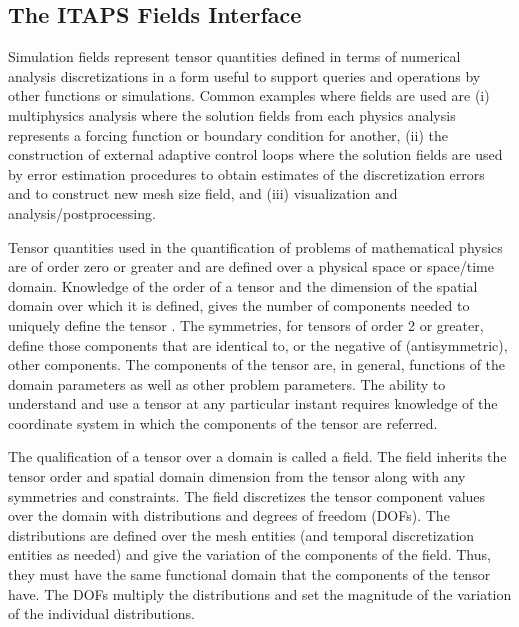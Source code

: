 \subsection{The ITAPS Fields Interface}
\label{sec:fields}

Simulation fields represent tensor quantities defined in terms of
numerical analysis discretizations in a form useful to support queries
and operations by other functions or simulations. Common examples
where fields are used are (i) multiphysics analysis where the solution
fields from each physics analysis represents a forcing function or
boundary condition for another, (ii) the construction of external
adaptive control loops where the solution fields are used by error
estimation procedures to obtain estimates of the discretization errors
and to construct new mesh size field, and (iii) visualization and 
analysis/postprocessing.

Tensor quantities used in the quantification of problems of
mathematical physics are of order zero or greater and are defined over
a physical space or space/time domain.  Knowledge of the order of a
tensor and the dimension of the spatial domain over which it is defined,
gives the number of components needed to uniquely define the tensor
\cite{BeSo83}. The symmetries, for tensors of order 2 or greater,
define those components that are identical to, or the negative of
(antisymmetric), other components. The components of the tensor are,
in general, functions of the domain parameters as well as other
problem parameters. The ability to understand and use a tensor at any
particular instant requires knowledge of the coordinate system in
which the components of the tensor are referred.

The qualification of a tensor over a domain is called a field. The
field inherits the tensor order and spatial domain dimension from the
tensor along with any symmetries and constraints. The field
discretizes the tensor component values over the domain with
distributions and degrees of freedom (DOFs). The distributions are
defined over the mesh entities (and temporal discretization entities
as needed) and give the variation of the components of the
field. Thus, they must have the same functional domain that the
components of the tensor have.  The DOFs multiply the distributions and
set the magnitude of the variation of the individual distributions.

